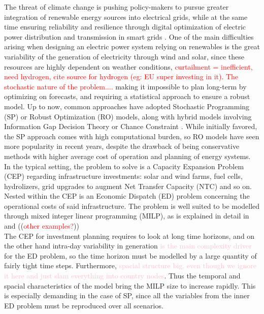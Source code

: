 The threat of climate change is pushing policy-makers to pursue greater integration of renewable energy sources into electrical grids, while at the same time ensuring reliability and resilience through digital optimization of electric power distribution and transmission in smart grids \textcolor{green}{\cite{EU_context}}. One of the main difficulties arising when designing an electric power system relying on renewables is the great variability of the generation of electricity through wind and solar, since these resources are highly dependent on weather conditions, \textcolor{red}{curtailment = inefficient, need hydrogen, cite source for hydrogen (eg: EU super investing in it). The stochastic nature of the problem....} making it impossible to plan long-term by optimizing on forecasts, and requiring a statistical approach to ensure a robust model.
Up to now, common approaches have adopted Stochastic Programming (SP) or Robust Optimization (RO) models, along with hybrid models involving Information Gap Decision Theory or Chance Constraint \textcolor{green}{\cite{review_math_opt}}. While initially favored, the SP approach comes with high computational burden, so RO models have seen more popularity in recent years, despite the drawback of being conservative methods with higher average cost of operation and planning of energy systems.\\
\indent In the typical setting, the problem to solve is a Capacity Expansion Problem (CEP) regarding infrastructure investments: solar and wind farms, fuel cells, hydrolizers, grid upgrades to augment Net Transfer Capacity (NTC) and so on. Nested within the CEP is an Economic Dispatch (ED) problem concerning the operational costs of said infrastructure. 
The problem is well suited to be modelled through mixed integer linear programming (MILP), as is explained in detail in \textcolor{green}{\cite{INTRO_isolated_MIP}} and ((\textcolor{red}{other examples?}))\\
\indent The CEP for investment planning requires to look at long time horizons, and on the other hand intra-day variability in generation \textcolor{pink}{is the main complexity driver} for the ED problem, so the time horizon must be modelled by a large quantity of fairly tight time steps. Furthermore, \textcolor{pink}{spacial structure big, even though we ignore it here and just slam everything into country nodes}. 
Thus the temporal and spacial characteristics of the model bring the MILP size to increase rapidly. This is especially demanding in the case of SP, since all the variables from the inner ED problem must be reproduced over all scenarios.\\
